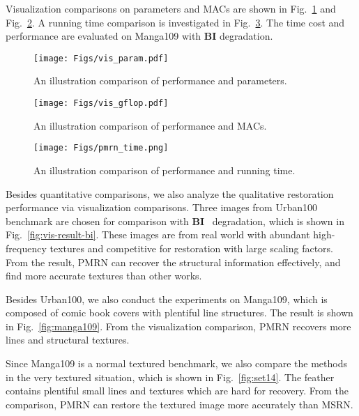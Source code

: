 \documentclass[journal]{IEEEtran}
\begin{document}
Visualization comparisons on parameters and MACs are shown in Fig.~\ref{fig:vis_param} and Fig.~\ref{fig:vis_flops}. A running time comparison is investigated in Fig.~\ref{fig:time}. The time cost and performance are evaluated on Manga109 with \textbf{BI} degradation.

\begin{figure}
	\centering
	\texttt{[image: Figs/vis\_param.pdf]}
	\caption{An illustration comparison of performance and parameters.}
	\label{fig:vis_param}
\end{figure}

\begin{figure}
	\centering
	\texttt{[image: Figs/vis\_gflop.pdf]}
	\caption{An illustration comparison of performance and MACs.}
	\label{fig:vis_flops}
\end{figure}

\begin{figure}
    \centering
    \texttt{[image: Figs/pmrn\_time.png]}
    \caption{An illustration comparison of performance and running time.}
    \label{fig:time}
\end{figure}



	
	
	
	
	
Besides quantitative comparisons, we also analyze the qualitative restoration performance via visualization comparisons. Three images from Urban100 benchmark are chosen for comparison with \textbf{BI}~ degradation, which is shown in Fig.~\ref{fig:vis-result-bi}. These images are from real world with abundant high-frequency textures and competitive for restoration with large scaling factors. From the result, PMRN can recover the structural information effectively, and find more accurate textures than other works.

Besides Urban100, we also conduct the experiments on Manga109, which is composed of comic book covers with plentiful line structures. The result is shown in Fig.~\ref{fig:manga109}. From the visualization comparison, PMRN recovers more lines and structural textures.

Since Manga109 is a normal textured benchmark, we also compare the methods in the very textured situation, which is shown in Fig.~\ref{fig:set14}. The feather contains plentiful small lines and textures which are hard for recovery. From the comparison, PMRN can restore the textured image more accurately than MSRN.
\end{document}
